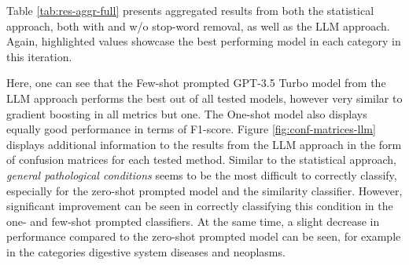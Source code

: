 Table \ref{tab:res-aggr-full} presents aggregated results from both the statistical approach, both with and w/o stop-word removal, as well as the LLM approach. Again, highlighted values showcase the best performing model in each category in this iteration.

\begin{table}[ht]
\centering
{}
\caption{Aggregated results from both the statistical and LLM approach. Models in \textit{italic} showcase results with stop-words removed.}
\label{tab:res-aggr-full}
\end{table}

Here, one can see that the Few-shot prompted GPT-3.5 Turbo model from the LLM approach performs the best out of all tested models, however very similar to gradient boosting in all metrics but one. The One-shot model also displays equally good performance in terms of F1-score. Figure \ref{fig:conf-matrices-llm} displays additional information to the results from the LLM approach in the form of confusion matrices for each tested method. Similar to the statistical approach, \textit{general pathological conditions} seems to be the most difficult to correctly classify, especially for the zero-shot prompted model and the similarity classifier. However, significant improvement can be seen in correctly classifying this condition in the one- and few-shot prompted classifiers. At the same time, a slight decrease in performance compared to the zero-shot prompted model can be seen, for example in the categories digestive system diseases and neoplasms.

